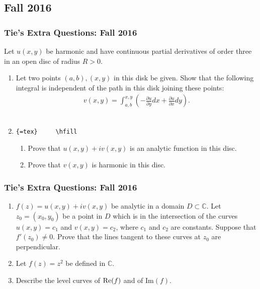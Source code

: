 \hypertarget{fall-2016}{%
\subsection{Fall 2016}\label{fall-2016}}

\hypertarget{ties-extra-questions-fall-2016}{%
\subsubsection{Tie's Extra Questions: Fall
2016}\label{ties-extra-questions-fall-2016}}

Let \(u(x,y)\) be harmonic and have continuous partial derivatives of
order three in an open disc of radius \(R>0\).

\begin{enumerate}
\def\labelenumi{(\alph{enumi})}
\item
  Let two points \((a,b), (x,y)\) in this disk be given. Show that the
  following integral is independent of the path in this disk joining
  these points:
  \begin{align*}v(x,y) = \int_{a,b}^{x,y} ( -\frac{\partial u}{\partial y}dx +  \frac{\partial u}{\partial x}dy).\end{align*}
  \\
\item
  \texttt{\{=tex\}\ \ \ \ \ \textbackslash{}hfill}

  \begin{enumerate}
  \def\labelenumii{(\roman{enumii})}
  \item
    Prove that \(u(x,y)+i v(x,y)\) is an analytic function in this disc.
  \item
    Prove that \(v(x,y)\) is harmonic in this disc.
  \end{enumerate}
\end{enumerate}

\hypertarget{ties-extra-questions-fall-2016-1}{%
\subsubsection{Tie's Extra Questions: Fall
2016}\label{ties-extra-questions-fall-2016-1}}

\begin{enumerate}
\def\labelenumi{(\alph{enumi})}
\item
  \(f(z)= u(x,y) +i v(x,y)\) be analytic in a domain
  \(D\subset {\mathbb C}\). Let \(z_0=(x_0,y_0)\) be a point in \(D\)
  which is in the intersection of the curves \(u(x,y)= c_1\) and
  \(v(x,y)=c_2\), where \(c_1\) and \(c_2\) are constants. Suppose that
  \(f'(z_0)\neq 0\). Prove that the lines tangent to these curves at
  \(z_0\) are perpendicular.
\item
  Let \(f(z)=z^2\) be defined in \({\mathbb C}\).
\item
  Describe the level curves of \(\mbox{\textrm Re}{(f)}\) and of
  \(\mbox{Im}{(f)}\).
\end{enumerate}

